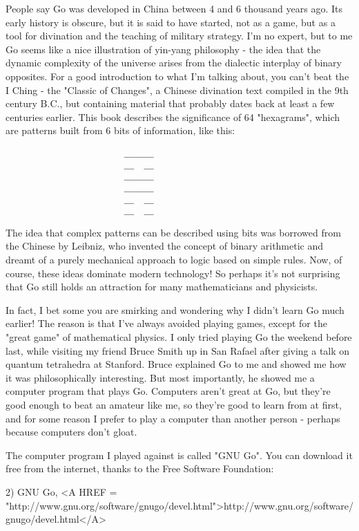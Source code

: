 People say Go was developed in China between 4 and 6 thousand years ago.  
Its early history is obscure, but it is said to have started, not as a game, 
but as a tool for divination and the teaching of military strategy.   I'm 
no expert, but to me Go seems like a nice illustration of yin-yang 
philosophy - the idea that the dynamic complexity of the universe arises 
from the dialectic interplay of binary opposites.   For a good
introduction to what I'm talking about, you can't beat the I Ching - the
"Classic of Changes", a Chinese divination text compiled in the 9th century
B.C., but containing material that probably dates back at least a few
centuries earlier.   This book describes the significance of 64 "hexagrams", 
which are patterns built from 6 bits of information, like this:

\begin{verbatim}
                        ______
                        __  __
                        ______
                        ______
                        __  __
                        __  __
\end{verbatim}
    

The idea that complex patterns can be described using bits was borrowed
from the Chinese by Leibniz, who invented the concept of binary arithmetic
and dreamt of a purely mechanical approach to logic based on simple rules.
Now, of course, these ideas dominate modern technology!  So perhaps it's
not surprising that Go still holds an attraction for many mathematicians
and physicists.  

In fact, I bet some you are smirking and wondering why I didn't learn Go
much earlier!  The reason is that I've always avoided playing games,
except for the "great game" of mathematical physics.  I only tried
playing Go the weekend before last, while visiting my friend Bruce Smith
up in San Rafael after giving a talk on quantum tetrahedra at Stanford.  
Bruce explained Go to me and showed me how it was philosophically  
interesting.  But most importantly, he showed me a computer program
that plays Go.  Computers aren't great at Go, but they're good enough to
beat an amateur like me, so they're good to learn from at first, and for
some reason I prefer to play a computer than another person - perhaps because 
computers don't gloat.  

The computer program I played against is called "GNU Go".  You can download
it free from the internet, thanks to the Free Software Foundation:

2) GNU Go, <A HREF = "http://www.gnu.org/software/gnugo/devel.html">http://www.gnu.org/software/gnugo/devel.html</A>


